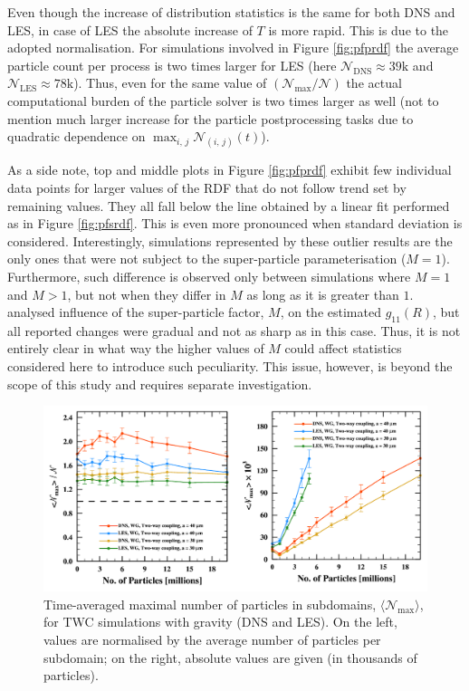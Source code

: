 \documentclass{pracamgren}
\begin{document}
Even though the increase of distribution statistics is the same for both DNS and LES, in case of LES the absolute increase of $T$ is more rapid.
This is due to the adopted normalisation.
For simulations involved in Figure \ref{fig:pfprdf} the average particle count per process is two times larger for LES (here $\mathcal{N}_{\text{DNS}} \approx 39\text{k}$ and $\mathcal{N}_{\text{LES}} \approx 78\text{k}$).
Thus, even for the same value of $(\mathcal{N}_{\max} / \mathcal{N})$ the actual computational burden of the particle solver is two times larger as well (not to mention much larger increase for the particle postprocessing tasks due to quadratic dependence on $\max_{i,\,j} \mathcal{N}_{(i,\,j)}(t)$).

As a side note, top and middle plots in Figure \ref{fig:pfprdf} exhibit few individual data points for larger values of the RDF that do not follow trend set by remaining values.
They all fall below the line obtained by a linear fit performed as in Figure \ref{fig:pfsrdf}.
This is even more pronounced when standard deviation is considered.
Interestingly, simulations represented by these outlier results are the only ones that were not subject to the super-particle parameterisation ($M=1$).
Furthermore, such difference is observed only between simulations where $M = 1$ and $M > 1$, but not when they differ in $M$ as long as it is greater than $1$.
\textcite{Rosa2022} analysed influence of the super-particle factor, $M$, on the estimated $g_{11}(R)$, but all reported changes were gradual and not as sharp as in this case.
Thus, it is not entirely clear in what way the higher values of $M$ could affect statistics considered here to introduce such peculiarity.
This issue, however, is beyond the scope of this study and requires separate investigation. 

\begin{figure}[ht]
\centering
\includegraphics[width=13.5cm]{figures/3-16_pfptwc.pdf}
\caption{
Time-averaged maximal number of particles in subdomains, $\langle \mathcal{N}_{\max} \rangle$, for TWC simulations with gravity (DNS and LES).
On the left, values are normalised by the average number of particles per subdomain; on the right, absolute values are given (in thousands of particles).
}
\label{fig:pfptwc}
\end{figure}
\end{document}

